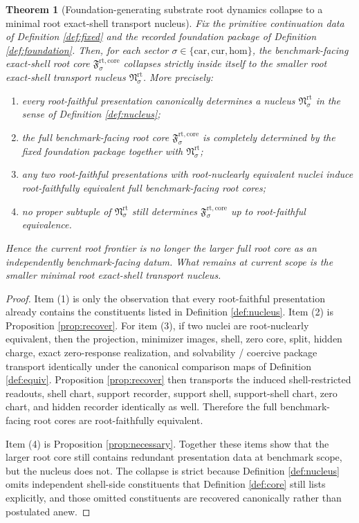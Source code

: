 \documentclass[11pt]{article}
\newcommand{\Car}{\mathrm{car}}
\newcommand{\Cur}{\mathrm{cur}}
\newcommand{\Hom}{\mathrm{hom}}
\newcommand{\RootCore}[1]{\mathfrak F_{#1}^{\mathrm{rt,core}}}
\newcommand{\RootNucleus}[1]{\mathfrak N_{#1}^{\mathrm{rt}}}
\newtheorem{theorem}{Theorem}
\begin{document}
\begin{theorem}[Foundation-generating substrate root dynamics collapse to a minimal root exact-shell transport nucleus]
\label{thm:main}
Fix the primitive continuation data of Definition \ref{def:fixed} and the recorded foundation package of Definition \ref{def:foundation}. Then, for each sector \(\sigma\in\{\Car,\Cur,\Hom\}\), the benchmark-facing exact-shell root core \(\RootCore{\sigma}\) collapses strictly inside itself to the smaller root exact-shell transport nucleus \(\RootNucleus{\sigma}\). More precisely:
\begin{enumerate}
    \item every root-faithful presentation canonically determines a nucleus \(\RootNucleus{\sigma}\) in the sense of Definition \ref{def:nucleus};
    \item the full benchmark-facing root core \(\RootCore{\sigma}\) is completely determined by the fixed foundation package together with \(\RootNucleus{\sigma}\);
    \item any two root-faithful presentations with root-nuclearly equivalent nuclei induce root-faithfully equivalent full benchmark-facing root cores;
    \item no proper subtuple of \(\RootNucleus{\sigma}\) still determines \(\RootCore{\sigma}\) up to root-faithful equivalence.
\end{enumerate}
Hence the current root frontier is no longer the larger full root core as an independently benchmark-facing datum. What remains at current scope is the smaller minimal root exact-shell transport nucleus.
\end{theorem}

\begin{proof}
Item (1) is only the observation that every root-faithful presentation already contains the constituents listed in Definition \ref{def:nucleus}. Item (2) is Proposition \ref{prop:recover}. For item (3), if two nuclei are root-nuclearly equivalent, then the projection, minimizer images, shell, zero core, split, hidden charge, exact zero-response realization, and solvability / coercive package transport identically under the canonical comparison maps of Definition \ref{def:equiv}. Proposition \ref{prop:recover} then transports the induced shell-restricted readouts, shell chart, support recorder, support shell, support-shell chart, zero chart, and hidden recorder identically as well. Therefore the full benchmark-facing root cores are root-faithfully equivalent.

Item (4) is Proposition \ref{prop:necessary}. Together these items show that the larger root core still contains redundant presentation data at benchmark scope, but the nucleus does not. The collapse is strict because Definition \ref{def:nucleus} omits independent shell-side constituents that Definition \ref{def:core} still lists explicitly, and those omitted constituents are recovered canonically rather than postulated anew.
\end{proof}
\end{document}
